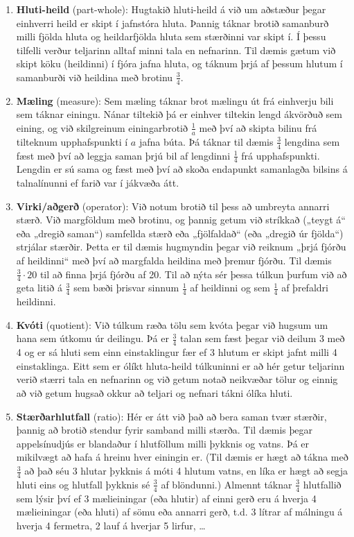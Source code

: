 \documentclass[
  icelandic,
]{book}
\providecommand{\tightlist}{%
  \setlength{\itemsep}{0pt}\setlength{\parskip}{0pt}}
\begin{document}
\begin{enumerate}
\def\labelenumi{\alph{enumi}.}
\tightlist
\item
  \textbf{Hluti-heild} (part-whole): Hugtakið hluti-heild á við um aðstæður þegar einhverri heild er skipt í jafnstóra hluta. Þannig táknar brotið samanburð milli fjölda hluta og heildarfjölda hluta sem stærðinni var skipt í. Í þessu tilfelli verður teljarinn alltaf minni tala en nefnarinn. Til dæmis gætum við skipt köku (heildinni) í fjóra jafna hluta, og táknum þrjá af þessum hlutum í samanburði við heildina með brotinu \(\frac{3}{4}\).
\item
  \textbf{Mæling} (measure): Sem mæling táknar brot mælingu út frá einhverju bili sem táknar einingu. Nánar tiltekið þá er einhver tiltekin lengd ákvörðuð sem eining, og við skilgreinum einingarbrotið \(\frac{1}{a}\) með því að skipta bilinu frá tilteknum upphafspunkti í \(a\) jafna búta. Þá táknar til dæmis \(\frac{3}{4}\) lengdina sem fæst með því að leggja saman þrjú bil af lengdinni \(\frac{1}{4}\) frá upphafspunkti. Lengdin er sú sama og fæst með því að skoða endapunkt samanlagða bilsins á talnalínunni ef farið var í jákvæða átt.
\item
  \textbf{Virki/aðgerð} (operator): Við notum brotið til þess að umbreyta annarri stærð. Við margföldum með brotinu, og þannig getum við stríkkað („teygt á`` eða „dregið saman``) samfellda stærð eða „fjölfaldað`` (eða „dregið úr fjölda``) strjálar stærðir. Þetta er til dæmis hugmyndin þegar við reiknum „þrjá fjórðu af heildinni`` með því að margfalda heildina með þremur fjórðu. Til dæmis \(\frac{3}{4} \cdot 20\) til að finna þrjá fjórðu af 20. Til að nýta sér þessa túlkun þurfum við að geta litið á \(\frac{3}{4}\) sem bæði þrisvar sinnum \(\frac{1}{4}\) af heildinni og sem \(\frac{1}{4}\) af þrefaldri heildinni.
\item
  \textbf{Kvóti} (quotient): Við túlkum ræða tölu sem kvóta þegar við hugsum um hana sem útkomu úr deilingu. Þá er \(\frac{3}{4}\) talan sem fæst þegar við deilum 3 með 4 og er sá hluti sem einn einstaklingur fær ef 3 hlutum er skipt jafnt milli 4 einstaklinga. Eitt sem er ólíkt hluta-heild túlkuninni er að hér getur teljarinn verið stærri tala en nefnarinn og við getum notað neikvæðar tölur og einnig að við getum hugsað okkur að teljari og nefnari tákni ólíka hluti.
\item
  \textbf{Stærðarhlutfall} (ratio): Hér er átt við það að bera saman tvær stærðir, þannig að brotið stendur fyrir samband milli stærða. Til dæmis þegar appelsínudjús er blandaður í hlutföllum milli þykknis og vatns. Þá er mikilvægt að hafa á hreinu hver einingin er. (Til dæmis er hægt að tákna með \(\frac{3}{4}\) að það séu 3 hlutar þykknis á móti 4 hlutum vatns, en líka er hægt að segja hluti eins og hlutfall þykknis sé \(\frac{3}{4}\) af blöndunni.) Almennt táknar \(\frac{3}{4}\) hlutfallið sem lýsir því ef 3 mælieiningar (eða hlutir) af einni gerð eru á hverja 4 mælieiningar (eða hluti) af sömu eða annarri gerð, t.d. 3 lítrar af málningu á hverja 4 fermetra, 2 lauf á hverjar 5 lirfur, \ldots{}

\end{enumerate}
\end{document}
